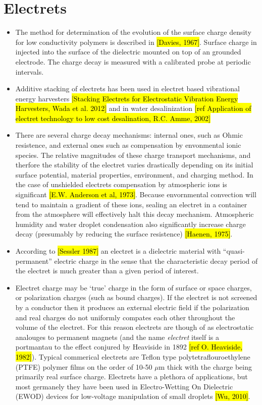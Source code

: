 \documentclass[10pt,a4paper]{article}
\author{Erin Schmidt}
\begin{document}
\section{Electrets}
\begin{itemize}
\item The method for determination of the evolution of the surface charge density for low conductivity polymers is described in \hl{[Davies, 1967]}. Surface charge in injected into the surface of the dielectric mounted on top of an grounded electrode. The charge decay is measured with a calibrated probe at periodic intervals.
\item Additive stacking of electrets has been used in electret based vibrational energy harvesters \hl{[Stacking Electrets for Electrostatic Vibration Energy Harvesters, Wada et al. 2012]} and in water desalinization \hl{[ref Application of electret technology to low cost desalination, R.C. Amme, 2002]}
\item There are several charge decay mechanisms: internal ones, such as Ohmic resistence, and external ones such as compensation by envonmental ionic species. The relative magnitudes of these charge transport mechanisms, and therfore the stability of the electret varies drastically depending on its initial surface potential, material properties, environment, and charging method. In the case of unshielded electrets compensation by atmospheric ions is significant \hl{[E.W. Anderson et al, 1973]}. Because envornmental convection will tend to  maintain a gradient of these ions, sealing an electret in a container from the atmosphere will effectively halt this decay mechanism. Atmospheric humidity and water droplet condensation also significantly increase charge decay (presumably by reducing the surface resistence) \hl{[Haenen, 1975]}.
\item According to \hl{[Sessler 1987]} an electret is a dielectric material with ``quasi-permanent'' electric charge in the sense that the characteristic decay period of the electret is much greater than a given period of interest.
\item Electret charge may be `true' charge in the form of surface or space charges, or polarization charges (such as bound charges). If the electret is not screened by a conductor then it produces an external electric field if the polarization and real charges do not uniformly compates each other throughout the volume of the electret. For this reason electrets are though of as electrostatic analouges to permanent magnets (and the name \emph{electret} itself is a portmantau to the effect conjured by Heaviside in 1892 \hl{[ref O. Heaviside, 1982]}). Typical commerical electrets are Teflon type polytetraflouroethylene (PTFE) polymer films on the order of 10-50 $\mu$m thick with the charge being primarily real surface charge. Electrets have a plethora of applications, but most germanely they have been used in Electro-Wetting On Dielectric (EWOD) devices for low-voltage manipulation of small droplets \hl{[Wu, 2010]}. 

\end{itemize}
\end{document}
